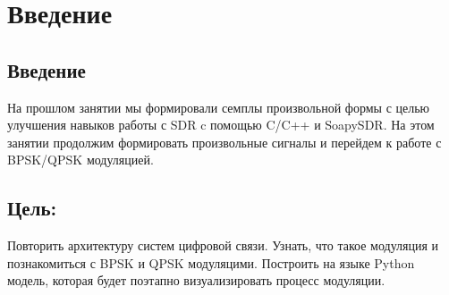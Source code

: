 \chapter{Введение}

\section{Введение}

На прошлом занятии мы формировали семплы произвольной формы с целью улучшения навыков работы с SDR c помощью C/C++ и SoapySDR.
На этом занятии продолжим формировать произвольные сигналы и перейдем к работе с BPSK/QPSK модуляцией.

\section{Цель:}

Повторить архитектуру систем цифровой связи. Узнать, что такое модуляция и познакомиться с BPSK и QPSK модуляцими. 
Построить на языке Python модель, которая будет поэтапно визуализировать процесс модуляции. 

\endinput
